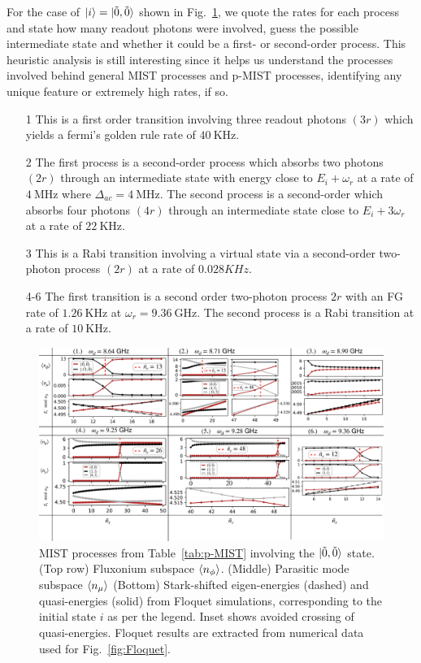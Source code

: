 \documentclass[%
reprint,
superscriptaddress,
 amsmath,amssymb,
 aps,
 prx,
longbibliography,
floatfix,
]{revtex4-2}
\begin{document}
For the case of $\ket{i}=\ket{\tilde{0},\tilde{0}}$ shown in Fig.~\ref{fig:Trans0}, we quote the rates for each process and state how many readout photons were involved, guess the possible intermediate state and whether it could be a first- or second-order process. This heuristic analysis is still interesting since it helps us understand the processes involved behind general MIST processes and p-MIST processes, identifying any unique feature or extremely high rates, if so. 
\begin{itemize}
    \item[1] This is a first order transition involving three readout photons $(3r)$ which yields a fermi's golden rule rate of $40 \ \mathrm{KHz}$. 
    \item[2] The first process is a second-order process which absorbs two photons $(2r)$ through an intermediate state with energy close to $E_i+\omega_r$ at a rate of $4 \ \mathrm{MHz}$ where $\Delta_{ac}=4 \ \mathrm{MHz}$. The second process is a second-order which absorbs four photons $(4r)$ through an intermediate state close to $E_i+3\omega_r$ at a rate of $22 \ \mathrm{KHz}$. 
    \item[3] This is a Rabi transition involving a virtual state via a second-order two-photon process $(2r)$ at a rate of $0.028 KHz$. 
    \item[4-6] The first transition is a second order two-photon process $2r$ with an FG rate of $1.26 \ \mathrm{KHz}$ at $\omega_r=9.36 \ \mathrm{GHz}$. The second process is a Rabi transition at a rate of $10 \ \mathrm{KHz}$. 
\end{itemize} 
\begin{figure}
    \centering
    \includegraphics[width=1.0\textwidth]{Figures/Trans0.pdf}
    \caption{MIST processes from Table~\ref{tab:p-MIST} involving the $\ket{\tilde{0},\tilde{0}}$ state. (Top row) Fluxonium subspace $\braket{n_\phi}$. (Middle) Parasitic mode subspace $\braket{n_\mu}$ (Bottom) Stark-shifted eigen-energies (dashed) and quasi-energies (solid) from Floquet simulations, corresponding to the initial state $i$ as per the legend. Inset shows avoided crossing of quasi-energies. Floquet results are extracted from numerical data used for Fig.~\ref{fig:Floquet}.}
    \label{fig:Trans0}
\end{figure}
\end{document}
